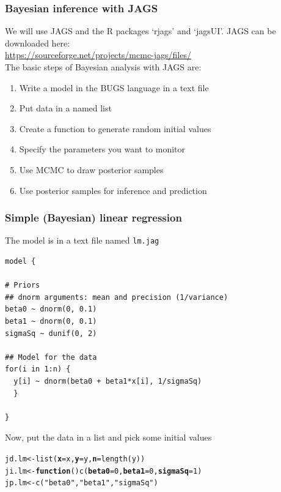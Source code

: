 \documentclass[color=usenames,dvipsnames]{beamer}\usepackage[]{graphicx}\usepackage[]{color}
\makeatletter
\newcommand{\hlnum}[1]{\textcolor[rgb]{0.69,0.494,0}{#1}}%
\newcommand{\hlstr}[1]{\textcolor[rgb]{0.749,0.012,0.012}{#1}}%
\newcommand{\hlstd}[1]{\textcolor[rgb]{0,0,0}{#1}}%
\newcommand{\hlkwa}[1]{\textcolor[rgb]{0,0,0}{\textbf{#1}}}%
\newcommand{\hlkwb}[1]{\textcolor[rgb]{0,0.341,0.682}{#1}}%
\newcommand{\hlkwc}[1]{\textcolor[rgb]{0,0,0}{\textbf{#1}}}%
\newcommand{\hlkwd}[1]{\textcolor[rgb]{0.004,0.004,0.506}{#1}}%
\newenvironment{kframe}{%
 \def\at@end@of@kframe{}%
 \ifinner\ifhmode%
  \def\at@end@of@kframe{\end{minipage}}%
  \begin{minipage}{\columnwidth}%
 \fi\fi%
 \def\FrameCommand##1{\hskip\@totalleftmargin \hskip-\fboxsep
 \colorbox{shadecolor}{##1}\hskip-\fboxsep
     \hskip-\linewidth \hskip-\@totalleftmargin \hskip\columnwidth}%
 \MakeFramed {\advance\hsize-\width
   \@totalleftmargin\z@ \linewidth\hsize
   \@setminipage}}%
 {\par\unskip\endMakeFramed%
 \at@end@of@kframe}
\newenvironment{knitrout}{}{} %
\makeatother
\begin{document}
\begin{frame}
  \frametitle{Bayesian inference with JAGS}
  We will use JAGS and the R packages `rjags' and `jagsUI'.
  JAGS can be downloaded here:  \\
  \centering
  \vfill
  \href{
    https://sourceforge.net/projects/mcmc-jags/files/}{
    \large
    \color{blue}
    https://sourceforge.net/projects/mcmc-jags/files/
  } \\
  \pause
  \vfill
  \flushleft
  The basic steps of Bayesian analysis with JAGS are:
  \begin{enumerate}%
    \item Write a model in the BUGS language in a text file
    \item Put data in a named list
    \item Create a function to generate random initial values
    \item Specify the parameters you want to monitor
    \item Use MCMC to draw posterior samples
    \item Use posterior samples for inference and prediction
  \end{enumerate}
\end{frame}





\begin{frame}[fragile]
  \frametitle{Simple (Bayesian) linear regression}
  \small
  The model is in a text file named {\tt lm.jag} \\
\begin{knitrout}\scriptsize
{}\color{fgcolor}\begin{kframe}
\begin{verbatim}
model {

# Priors
## dnorm arguments: mean and precision (1/variance)
beta0 ~ dnorm(0, 0.1)  
beta1 ~ dnorm(0, 0.1)
sigmaSq ~ dunif(0, 2)

## Model for the data
for(i in 1:n) {
  y[i] ~ dnorm(beta0 + beta1*x[i], 1/sigmaSq)
  }

}
\end{verbatim}
\end{kframe}
\end{knitrout}
\pause
\vfill
Now, put the data in a list and pick some initial values
\begin{knitrout}
\color{fgcolor}\begin{kframe}
\begin{alltt}
\hlstd{jd.lm} \hlkwb{<-} \hlkwd{list}\hlstd{(}\hlkwc{x}\hlstd{=x,} \hlkwc{y}\hlstd{=y,} \hlkwc{n}\hlstd{=}\hlkwd{length}\hlstd{(y))}
\hlstd{ji.lm} \hlkwb{<-} \hlkwa{function}\hlstd{()} \hlkwd{c}\hlstd{(}\hlkwc{beta0}\hlstd{=}\hlnum{0}\hlstd{,} \hlkwc{beta1}\hlstd{=}\hlnum{0}\hlstd{,} \hlkwc{sigmaSq}\hlstd{=}\hlnum{1}\hlstd{)}
\hlstd{jp.lm} \hlkwb{<-} \hlkwd{c}\hlstd{(}\hlstr{"beta0"}\hlstd{,} \hlstr{"beta1"}\hlstd{,} \hlstr{"sigmaSq"}\hlstd{)}
\end{alltt}
\end{kframe}
\end{knitrout}
\end{frame}
\end{document}
